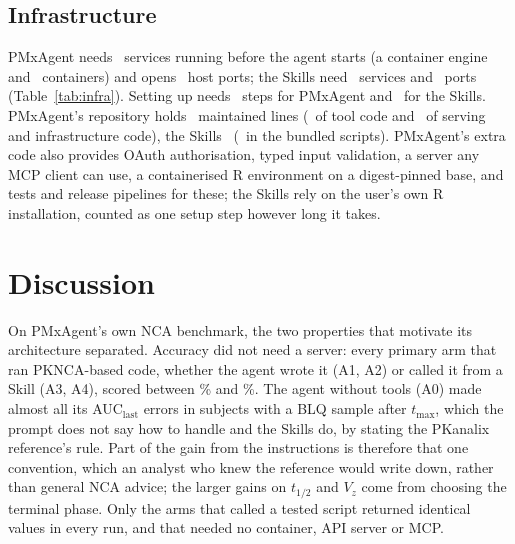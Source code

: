 \documentclass[11pt]{article}
\begin{document}
\subsection{Infrastructure}
PMxAgent needs \numInfraPmxagentService\ services running before the agent starts (a container engine and
\numInfraPmxagentContainer\ containers) and opens \numInfraPmxagentPort\ host ports; the Skills need
\numInfraSkillsService\ services and \numInfraSkillsPort\ ports (Table~\ref{tab:infra}). Setting up needs
\numInfraPmxagentSetup\ steps for PMxAgent and \numInfraSkillsSetup\ for the Skills. PMxAgent's repository holds
\numInfraPmxagentLines\ maintained lines (\numInfraPmxagentTool\ of tool code and \numInfraPmxagentServing\ of serving
and infrastructure code), the Skills \numInfraSkillsLines\ (\numInfraSkillsTool\ in the bundled scripts). PMxAgent's
extra code also provides OAuth authorisation, typed input validation, a server any MCP client can use, a containerised R
environment on a digest-pinned base, and tests and release pipelines for these; the Skills rely on the user's own R
installation, counted as one setup step however long it takes.

\begin{table}[t]
\centering\small
\caption{Infrastructure footprint per stack. Lines are non-blank, non-comment lines in the repository (Python
docstrings count as lines, PMxAgent's Plumber route annotations as comments); documentation and licence files are not
counted. PMxAgent's \texttt{CLAUDE.md} is loaded only in arm A1b. PMxAgent's larger code base also provides OAuth,
typed input validation, a server that any MCP client can use and a container environment, which the Skills do not;
Skills follow an open format \cite{agentskillsspec} but need a client that reads it.
$^a$From a machine with Claude Code installed; each step is listed in \texttt{results/infra.csv}.
$^b$API router, MCP server, container and compose files, dependency lists and CI workflows.}
\label{tab:infra}

\end{table}

\section{Discussion}
On PMxAgent's own NCA benchmark, the two properties that motivate its architecture separated. Accuracy did not need a
server: every primary arm that ran PKNCA-based code, whether the agent wrote it (A1, A2) or called it from a Skill
(A3, A4), scored between \numToneAoneAcc\% and \numToneAtwoAcc\%. The agent without tools (A0) made almost all its
AUC$_\mathrm{last}$ errors in subjects with a BLQ sample after $t_\mathrm{max}$, which the prompt does not say how to
handle and the Skills do, by stating the PKanalix reference's rule. Part of the gain from the instructions is therefore
that one convention, which an analyst who knew the reference would write down, rather than general NCA advice; the
larger gains on $t_{1/2}$ and $V_z$ come from choosing the terminal phase. Only the arms that called a tested script
returned identical values in every run, and that needed no container, API server or MCP.
\end{document}
